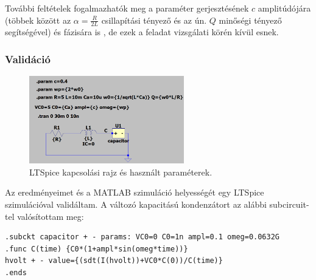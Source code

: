 \documentclass[12pt,a4paper]{article}
\begin{document}
További feltételek fogalmazhatók meg a paraméter gerjesztésének $c$ amplitúdójára (többek között az $\alpha = \frac{R}{2L}$ csillapítási tényező és az ún. $Q$ minőségi tényező segítségével) és fázisára is , de ezek a feladat vizsgálati körén kívül esnek.

\subsubsection{Validáció}

\begin{figure}[H]
    \centering
    \includegraphics[width=0.6\textwidth]{figures/ltspicecircuit.png}
    \caption{LTSpice kapcsolási rajz és használt paraméterek.}
    \label{fig:ltspicecircuit}
\end{figure}

Az eredményeimet és a MATLAB szimuláció helyességét egy LTSpice szimulációval validáltam. A változó kapacitású kondenzátort az alábbi subcircuit-tel valósítottam meg:

\begin{lstlisting}
.subckt capacitor + - params: VC0=0 C0=1n ampl=0.1 omeg=0.0632G
.func C(time) {C0*(1+ampl*sin(omeg*time))}
hvolt + - value={(sdt(I(hvolt))+VC0*C(0))/C(time)}
.ends
\end{lstlisting}
\end{document}
